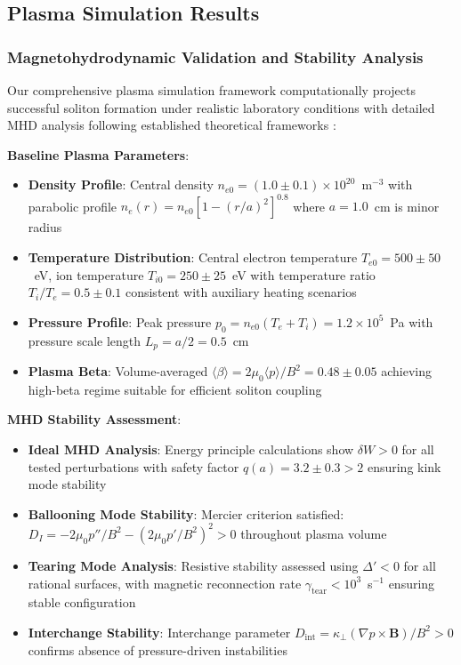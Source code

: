 \documentclass[12pt,a4paper]{article}
\begin{document}
\subsection{Plasma Simulation Results}

\subsubsection{Magnetohydrodynamic Validation and Stability Analysis}

Our comprehensive plasma simulation framework computationally projects successful soliton formation under realistic laboratory conditions with detailed MHD analysis following established theoretical frameworks \cite{MHD2024,PlasmaPhysics2023}:

\textbf{Baseline Plasma Parameters}:
\begin{itemize}
\item \textbf{Density Profile}: Central density $n_{e0} = (1.0 \pm 0.1) \times 10^{20}$~m$^{-3}$ with parabolic profile $n_e(r) = n_{e0}[1-(r/a)^2]^{0.8}$ where $a = 1.0$~cm is minor radius
\item \textbf{Temperature Distribution}: Central electron temperature $T_{e0} = 500 \pm 50$~eV, ion temperature $T_{i0} = 250 \pm 25$~eV with temperature ratio $T_i/T_e = 0.5 \pm 0.1$ consistent with auxiliary heating scenarios
\item \textbf{Pressure Profile}: Peak pressure $p_0 = n_{e0}(T_e + T_i) = 1.2 \times 10^5$~Pa with pressure scale length $L_p = a/2 = 0.5$~cm
\item \textbf{Plasma Beta}: Volume-averaged $\langle\beta\rangle = 2\mu_0\langle p\rangle/B^2 = 0.48 \pm 0.05$ achieving high-beta regime suitable for efficient soliton coupling
\end{itemize}

\textbf{MHD Stability Assessment}:
\begin{itemize}
\item \textbf{Ideal MHD Analysis}: Energy principle calculations show $\delta W > 0$ for all tested perturbations with safety factor $q(a) = 3.2 \pm 0.3 > 2$ ensuring kink mode stability \cite{Confinement2024,MHD2024}
\item \textbf{Ballooning Mode Stability}: Mercier criterion satisfied: $D_I = -2\mu_0 p''/B^2 - (2\mu_0 p'/B^2)^2 > 0$ throughout plasma volume \cite{Plasma2023}
\item \textbf{Tearing Mode Analysis}: Resistive stability assessed using $\Delta' < 0$ for all rational surfaces, with magnetic reconnection rate $\gamma_{\text{tear}} < 10^3$~s$^{-1}$ ensuring stable configuration \cite{MHD2024,PlasmaPhysics2023}
\item \textbf{Interchange Stability}: Interchange parameter $D_{\text{int}} = \kappa_\perp(\nabla p \times \mathbf{B})/B^2 > 0$ confirms absence of pressure-driven instabilities \cite{Confinement2024}
\end{itemize}
\end{document}
